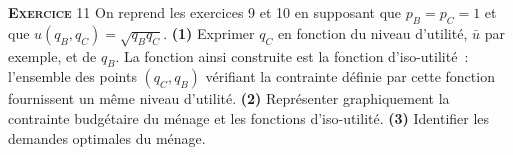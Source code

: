 \documentclass[10pt,a4paper,notitlepage]{article}
\newcommand{\exercice}[1]{\textsc{\textbf{Exercice}} #1}
\begin{document}
\exercice{11} On reprend les exercices 9 et 10 en supposant que $p_B =
p_C = 1$ et que $u(q_B, q_C) = \sqrt{q_Bq_C}$. \textbf{(1)} Exprimer
$q_C$ en fonction du niveau d'utilité, $\bar u$ par exemple, et de
$q_B$. La fonction ainsi construite est la fonction d'iso-utilité :
l'ensemble des points $(q_C,q_B)$ vérifiant la contrainte définie par
cette fonction fournissent un même niveau d'utilité. \textbf{(2)}
Représenter graphiquement la contrainte budgétaire du ménage et les
fonctions d'iso-utilité. \textbf{(3)} Identifier les demandes optimales
du ménage.
\end{document}
